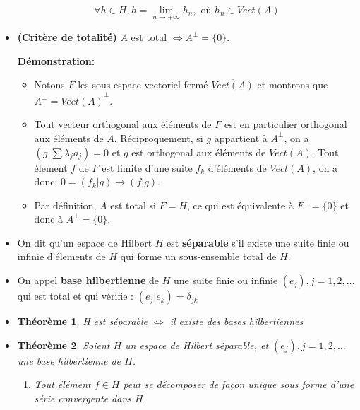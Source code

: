 \documentclass[10pt,a4paper,oneside]{article}
\newtheorem{theoreme}{Théorème}
\begin{document}
\begin{itemize}
\[ \forall h \in H, h = \underset{n \to +\infty}{\lim} h_n, \text{ où } h_n \in Vect(A) \]

\item
\textbf{(Critère de totalité)} $A$ est total $\Leftrightarrow A^\perp = \{ 0 \}$.

\textbf{Démonstration:}

\begin{itemize}

\item
Notons $F$ les sous-espace vectoriel fermé $\overline{Vect(A)}$ et montrons que $\boxed{A^\perp = \overline{Vect(A)}^\perp}$.

\item
Tout vecteur orthogonal aux éléments de $F$ est en particulier orthogonal aux éléments de $A$. Réciproquement, si $g$ appartient à $A^\perp$, on a $(g|\sum \lambda_j a_j) = 0$ et $g$ est orthogonal aux éléments de $Vect(A)$. Tout élement $f$ de $F$ est limite d'une suite $f_k$ d'éléments de $Vect(A)$, on a donc: $0 = (f_k | g) \to (f | g)$.

\item
Par définition, $A$ est total si $F = H$, ce qui est équivalente à $F^\perp = \{ 0 \}$ et donc à $A^\perp = \{ 0 \}$.

\end{itemize}

\item
On dit qu'un espace de Hilbert $H$ est \textbf{séparable} s'il existe une suite finie ou infinie d'élements de $H$ qui forme un sous-ensemble total de $H$.

\item
On appel \textbf{base hilbertienne} de $H$ une suite finie ou infinie $(e_j),j =1,2,\ldots$ qui est total et qui vérifie : $(e_j | e_k) = \delta_{jk}$

\item
\begin{theoreme}
H est séparable $\Leftrightarrow$ il existe des bases hilbertiennes
\end{theoreme}

\item
\begin{theoreme}
Soient $H$ un espace de Hilbert séparable, et $(e_j),j = 1,2,\ldots$ une base hilbertienne de $H$.

\begin{enumerate}
\item
Tout élément $f \in H$ peut se décomposer de façon unique sous forme d'une série convergente dans $H$


\end{enumerate}
\end{theoreme}
\end{itemize}
\end{document}
